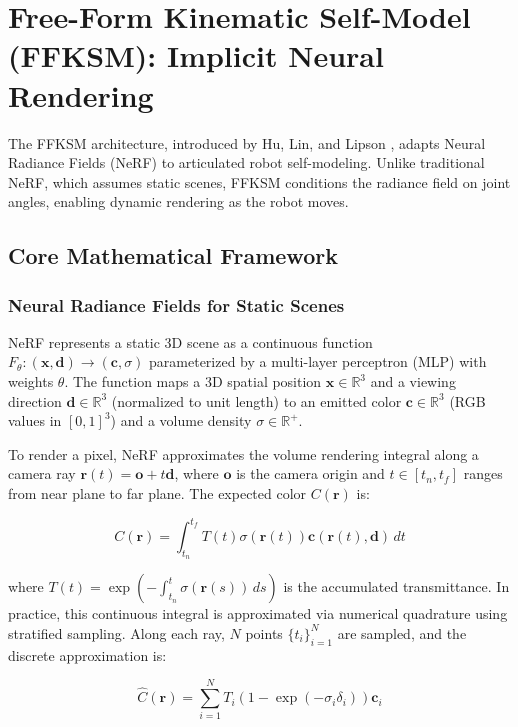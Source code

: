 \documentclass[12pt,a4paper,oneside]{report}
\begin{document}
\section{Free-Form Kinematic Self-Model (FFKSM): Implicit Neural Rendering}

The FFKSM architecture, introduced by Hu, Lin, and Lipson \cite{hu2024teaching}, adapts Neural Radiance Fields (NeRF) \cite{mildenhall2020nerf} to articulated robot self-modeling. Unlike traditional NeRF, which assumes static scenes, FFKSM conditions the radiance field on joint angles, enabling dynamic rendering as the robot moves.

\subsection{Core Mathematical Framework}

\subsubsection{Neural Radiance Fields for Static Scenes}

NeRF represents a static 3D scene as a continuous function $F_\theta: (\mathbf{x}, \mathbf{d}) \rightarrow (\mathbf{c}, \sigma)$ parameterized by a multi-layer perceptron (MLP) with weights $\theta$. The function maps a 3D spatial position $\mathbf{x} \in \mathbb{R}^3$ and a viewing direction $\mathbf{d} \in \mathbb{R}^3$ (normalized to unit length) to an emitted color $\mathbf{c} \in \mathbb{R}^3$ (RGB values in $[0,1]^3$) and a volume density $\sigma \in \mathbb{R}^+$.

To render a pixel, NeRF approximates the volume rendering integral along a camera ray $\mathbf{r}(t) = \mathbf{o} + t\mathbf{d}$, where $\mathbf{o}$ is the camera origin and $t \in [t_n, t_f]$ ranges from near plane to far plane. The expected color $C(\mathbf{r})$ is:

\begin{equation}
C(\mathbf{r}) = \int_{t_n}^{t_f} T(t) \sigma(\mathbf{r}(t)) \mathbf{c}(\mathbf{r}(t), \mathbf{d}) \, dt
\end{equation}

where $T(t) = \exp\left(-\int_{t_n}^{t} \sigma(\mathbf{r}(s)) \, ds\right)$ is the accumulated transmittance. In practice, this continuous integral is approximated via numerical quadrature using stratified sampling. Along each ray, $N$ points $\{t_i\}_{i=1}^N$ are sampled, and the discrete approximation is:

\begin{equation}
\hat{C}(\mathbf{r}) = \sum_{i=1}^{N} T_i (1 - \exp(-\sigma_i \delta_i)) \mathbf{c}_i
\end{equation}
\end{document}
